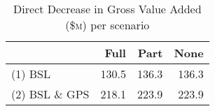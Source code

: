 \begin{table}[H]
\centering\footnotesize
\caption{\label{tab-chdgva}\footnotesize Direct Decrease in Gross Value Added (\$\textsc{m}) per scenario} 
\begin{tabular}{lrrr}
  \hline
 & Full & Part & None \\ 
  \hline
(1) BSL & 130.5 & 136.3 & 136.3 \\ 
  (2) BSL \& GPS & 218.1 & 223.9 & 223.9 \\ 
   \hline
\end{tabular}
\end{table}
